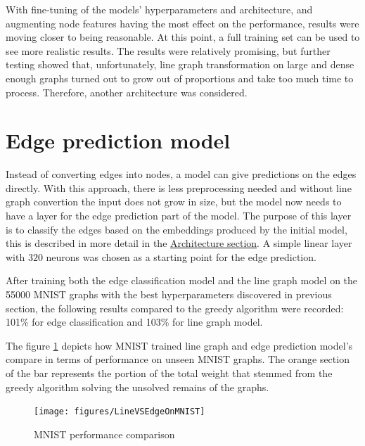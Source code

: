 With fine-tuning of the models' hyperparameters and architecture, and augmenting node features having the most effect on the performance, results were moving closer to being reasonable. At this point, a full training set can be used to see more realistic results. The results were relatively promising, but further testing showed that, unfortunately, line graph transformation on large and dense enough graphs turned out to grow out of proportions and take too much time to process. Therefore, another architecture was considered.

\section{Edge prediction model}

Instead of converting edges into nodes, a model can give predictions on the edges directly. With this approach, there is less preprocessing needed and without line graph convertion the input does not grow in size, but the model now needs to have a layer for the edge prediction part of the model. The purpose of this layer is to classify the edges based on the embeddings produced by the initial model, this is described in more detail in the \hyperref[sec:architecture]{Architecture section}. A simple linear layer with $320$ neurons was chosen as a starting point for the edge prediction.

After training both the edge classification model and the line graph model on the 55000 MNIST graphs with the best hyperparameters discovered in previous section, the following results compared to the greedy algorithm were recorded: 101\% for edge classification and 103\% for line graph model.

The figure \ref{Model performance on MNIST} depicts how MNIST trained line graph and edge prediction model's compare in terms of performance on unseen MNIST graphs. The orange section of the bar represents the portion of the total weight that stemmed from the greedy algorithm solving the unsolved remains of the graphs.
\begin{figure}[H]
    \centering
    \hspace*{-2cm}
    \texttt{[image: figures/LineVSEdgeOnMNIST]}
    \caption{MNIST performance comparison}
    \label{Model performance on MNIST}
\end{figure}

